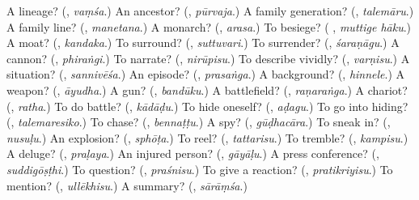 \begin{tcolorbox}[breakable,colback=teal!4,colframe=teal!35!black,title={Before you move on}]
A lineage? (\textbf{}, \emph{vaṃśa}.) An ancestor? (\textbf{}, \emph{pūrvaja}.) A family generation? (\textbf{}, \emph{talemāru}.) A family line? (\textbf{}, \emph{manetana}.) A monarch? (\textbf{}, \emph{arasa}.) To besiege? (\textbf{ }, \emph{muttige hāku}.) A moat? (\textbf{}, \emph{kandaka}.) To surround? (\textbf{}, \emph{suttuvari}.) To surrender? (\textbf{}, \emph{śaraṇāgu}.) A cannon? (\textbf{}, \emph{phiraṅgi}.) To narrate? (\textbf{}, \emph{nirūpisu}.) To describe vividly? (\textbf{}, \emph{varṇisu}.) A situation? (\textbf{}, \emph{sannivēśa}.) An episode? (\textbf{}, \emph{prasaṅga}.) A background? (\textbf{}, \emph{hinnele}.) A weapon? (\textbf{}, \emph{āyudha}.) A gun? (\textbf{}, \emph{bandūku}.) A battlefield? (\textbf{}, \emph{raṇaraṅga}.) A chariot? (\textbf{}, \emph{ratha}.) To do battle? (\textbf{}, \emph{kādāḍu}.) To hide oneself? (\textbf{}, \emph{aḍagu}.) To go into hiding? (\textbf{}, \emph{talemaresiko}.) To chase? (\textbf{}, \emph{bennaṭṭu}.) A spy? (\textbf{}, \emph{gūḍhacāra}.) To sneak in? (\textbf{}, \emph{nusuḷu}.) An explosion? (\textbf{}, \emph{sphōṭa}.) To reel? (\textbf{}, \emph{tattarisu}.) To tremble? (\textbf{}, \emph{kampisu}.) A deluge? (\textbf{}, \emph{praḷaya}.) An injured person? (\textbf{}, \emph{gāyāḷu}.) A press conference? (\textbf{}, \emph{suddigōṣṭhi}.) To question? (\textbf{}, \emph{praśnisu}.) To give a reaction? (\textbf{}, \emph{pratikriyisu}.) To mention? (\textbf{}, \emph{ullēkhisu}.) A summary? (\textbf{}, \emph{sārāṃśa}.)
\end{tcolorbox}
